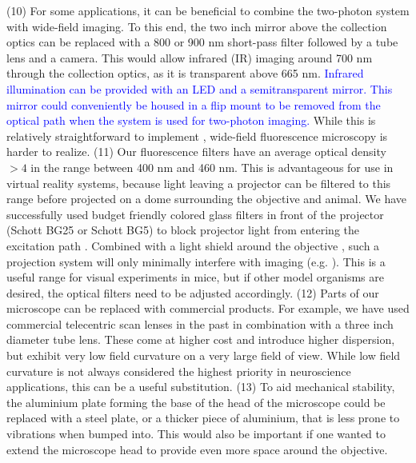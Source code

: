 \documentclass[10pt,letterpaper]{article}
\begin{document}
(10) For some applications, it can be beneficial to combine the two-photon system with wide-field imaging. To this end, the two inch mirror above the collection optics can be replaced with a 800 or 900 nm short-pass filter followed by a tube lens and a camera. This would allow infrared (IR) imaging around 700 nm through the collection optics, as it is transparent above 665 nm. \textcolor{blue}{Infrared illumination can be provided with an LED and a semitransparent mirror. This mirror could conveniently be housed in a flip mount to be removed from the optical path when the system is used for two-photon imaging.} While this is relatively straightforward to implement \cite{Rosenegger2014}, wide-field fluorescence microscopy is harder to realize.\newline
(11) Our fluorescence filters have an average optical density $>4$ in the range between 400 nm and 460 nm. This is advantageous for use in virtual reality systems, because light leaving a projector can be filtered to this range before projected on a dome surrounding the objective and animal. We have successfully used budget friendly colored glass filters in front of the projector (Schott BG25 or Schott BG5) to block projector light from entering the excitation path \cite{Dombeck2007}. Combined with a light shield around the objective \cite{Dombeck2010}, such a projection system will only minimally interfere with imaging (e.g. \cite{Nieh2021}). This is a useful range for visual experiments in mice, but if other model organisms are desired, the optical filters need to be adjusted accordingly.\newline
(12) Parts of our microscope can be replaced with commercial products. For example, we have used commercial telecentric scan lenses in the past \cite{Song2017, Rich2024} in combination with a three inch diameter tube lens. These come at higher cost and introduce higher dispersion, but exhibit very low field curvature on a very large field of view. While low field curvature is not always considered the highest priority in neuroscience applications, this can be a useful substitution.\newline
(13) To aid mechanical stability, the aluminium plate forming the base of the head of the microscope could be replaced with a steel plate, or a thicker piece of aluminium, that is less prone to vibrations when bumped into. This would also be important if one wanted to extend the microscope head to provide even more space around the objective.
\end{document}
